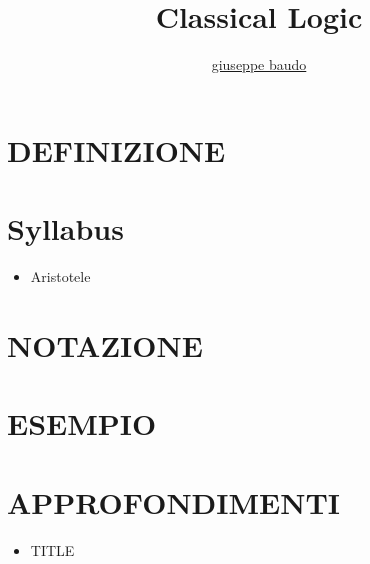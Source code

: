 \documentclass[a4paper,10pt]{article}
\title{Classical Logic}
\author{\href{http://www.baudo.hol.es}{giuseppe baudo}}
\begin{document}
\maketitle

\section{DEFINIZIONE}

\section{Syllabus}
\begin{itemize}
 \item Aristotele
\end{itemize}


\section{NOTAZIONE}

\section{ESEMPIO}

\section{APPROFONDIMENTI}
\begin{itemize}
 \item TITLE
\end{itemize}
\end{document}
